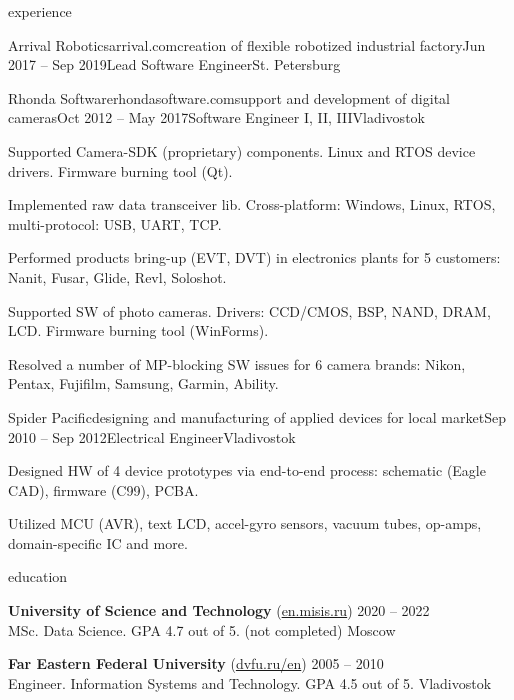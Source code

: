 \documentclass{Vladimir.Ivanov.CV}
\begin{document}
\begin{rSection}{experience}
\begin{rCompany}{Arrival Robotics}{arrival.com}{creation of flexible robotized industrial factory}{Jun 2017 -- Sep 2019}{Lead Software Engineer}{St. Petersburg}
\end{rCompany}
\begin{rCompany}{Rhonda Software}{rhondasoftware.com}{support and development of digital cameras}{Oct 2012 -- May 2017}{Software Engineer I, II, III}{Vladivostok}

\item Supported Camera-SDK (proprietary) components. Linux and RTOS device drivers. Firmware burning tool (Qt).
\item Implemented raw data transceiver lib. Cross-platform: Windows, Linux, RTOS, multi-protocol: USB, UART, TCP.
\item Performed products bring-up (EVT, DVT) in electronics plants for 5 customers: Nanit, Fusar, Glide, Revl, Soloshot.
\item Supported SW of photo cameras. Drivers: CCD/CMOS, BSP, NAND, DRAM, LCD. Firmware burning tool (WinForms).
\item Resolved a number of MP-blocking SW issues for 6 camera brands: Nikon, Pentax, Fujifilm, Samsung, Garmin, Ability.

\end{rCompany}
\begin{rCompany}{Spider Pacific}{}{designing and manufacturing of applied devices for local market}{Sep 2010 -- Sep 2012}{Electrical Engineer}{Vladivostok}

\item Designed HW of 4 device prototypes via end-to-end process: schematic (Eagle CAD), firmware (C99), PCBA.
\item Utilized MCU (AVR), text LCD, accel-gyro sensors, vacuum tubes, op-amps, domain-specific IC and more.

\end{rCompany}
\end{rSection}

\begin{rSection}{education}

{\bf University of Science and Technology } {(\href{https://en.misis.ru}{en.misis.ru})} \hfill {2020 -- 2022} \\
MSc. Data Science. GPA 4.7 out of 5. (not completed) \hfill {Moscow}

{\bf Far Eastern Federal University} {(\href{https://www.dvfu.ru/en}{dvfu.ru/en})} \hfill {2005 -- 2010} \\
Engineer. Information Systems and Technology. GPA 4.5 out of 5. \hfill {Vladivostok}

\end{rSection}
\end{document}
